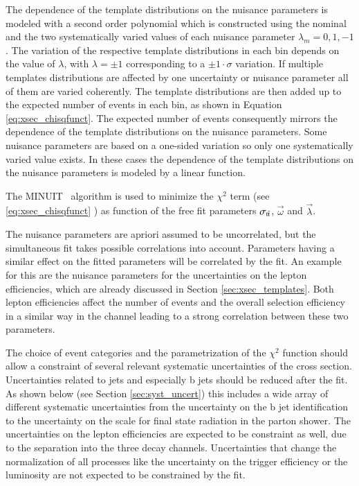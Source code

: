 The dependence of the template distributions on the nuisance parameters is modeled with a second order polynomial which is constructed using the nominal and the two systematically varied values of each nuisance parameter $\lambda_m=0, 1, -1$.
The variation of the respective template distributions in each bin depends on the value of $\lambda$, with $\lambda = \pm 1$ corresponding to a $ \pm 1 \cdot \sigma$ variation. If multiple templates distributions are affected by one uncertainty or nuisance parameter all of them are varied coherently.
The template distributions are then added up to the expected number of events in each bin, as shown in Equation \ref{eq:xsec_chisqfunct}. The expected number of events consequently mirrors the dependence of the template distributions on the nuisance parameters.
Some nuisance parameters are based on a one-sided variation so only one systematically varied value exists. In these cases the dependence of the template distributions on the nuisance parameters is modeled by a linear function.

The MINUIT~\cite{James:1975dr} algorithm is used to minimize the  $\chi^2$ term (see \ref{eq:xsec_chisqfunct} ) as function of the free fit parameters $\sigma_\mathrm{t\bar{t}}$, $\vec{\omega}$
and $\vec{\lambda}$. 

The nuisance parameters are apriori assumed to be uncorrelated, but the simultaneous fit takes possible correlations into account. Parameters having a similar effect on the fitted parameters will be correlated by the fit.
An example for this are the nuisance parameters for the uncertainties on the lepton efficiencies, which are already discussed in Section \ref{sec:xsec_templates}. Both lepton efficiencies affect the number of events and the overall selection efficiency in a similar way in the \emu channel leading to a strong correlation between these two parameters.

The choice of event categories and the parametrization of the $\chi^2$ function should allow a constraint of several relevant systematic uncertainties of the \ttbar cross section.
Uncertainties related to jets and especially b jets should be reduced after the fit. As shown below (see Section \ref{sec:syst_uncert}) this includes a wide array of different systematic uncertainties
from the uncertainty on the b jet identification to the uncertainty on the scale for final state radiation in the parton shower. The uncertainties on the lepton efficiencies are expected to be constraint as well, due to the separation into the three decay channels.
Uncertainties that change the normalization of all processes like the uncertainty on the trigger efficiency or the luminosity are not expected to be constrained by the fit.


